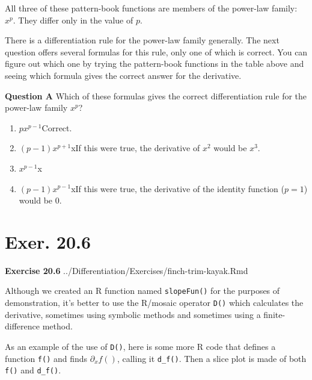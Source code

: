 \documentclass[
  letterpaper,
  DIV=11,
  numbers=noendperiod,
  oneside]{article}
\providecommand{\tightlist}{%
  \setlength{\itemsep}{0pt}\setlength{\parskip}{0pt}}\usepackage{longtable,booktabs,array}
\begin{document}
\begin{multicols}{2}
All three of these pattern-book functions are members of the power-law
family: \(x^p\). They differ only in the value of \(p\).

There is a differentiation rule for the power-law family generally. The
next question offers several formulas for this rule, only one of which
is correct. You can figure out which one by trying the pattern-book
functions in the table above and seeing which formula gives the correct
answer for the derivative.

\textbf{Question A} Which of these formulas gives the correct
differentiation rule for the power-law family \(x^p\)?

\begin{enumerate}
\def\labelenumi{\roman{enumi}.}
\tightlist
\item
  {\(p x^{p-1}\){Correct.~}}\\
\item
  {\((p-1) x^{p+1}\){xIf this were true, the derivative of \(x^2\)
  would be \(x^3\).}}\\
\item
  {\(x^{p-1}\){x}}\\
\item
  {\((p-1) x^{p-1}\){xIf this were true, the derivative of the
  identity function (\(p=1\)) would be 0.}}
\end{enumerate}

\hypertarget{exer.-20.6}{%
\section*{Exer. 20.6}\label{exer.-20.6}}

\textbf{Exercise 20.6} ../Differentiation/Exercises/finch-trim-kayak.Rmd

Although we created an R function named \texttt{slopeFun()} for the
purposes of demonstration, it's better to use the R/mosaic operator
\texttt{D()} which calculates the derivative, sometimes using symbolic
methods and sometimes using a finite-difference method.

As an example of the use of \texttt{D()}, here is some more R code that
defines a function \texttt{f()} and finds \(\partial_x f()\), calling it
\texttt{d\_f()}. Then a slice plot is made of both \texttt{f()} and
\texttt{d\_f()}.


\end{multicols}
\end{document}
